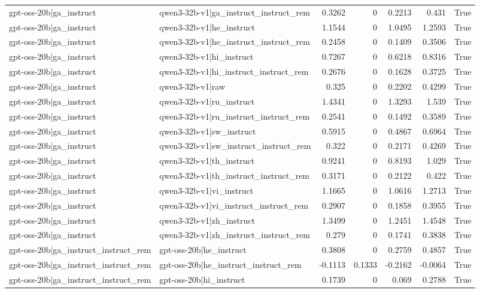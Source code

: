 \begin{table}
\begin{tabular}{l l r r r r l}
gpt-oss-20b|ga_instruct & qwen3-32b-v1|ga_instruct_instruct_rem & 0.3262 & 0 & 0.2213 & 0.431 & True \\
gpt-oss-20b|ga_instruct & qwen3-32b-v1|he_instruct & 1.1544 & 0 & 1.0495 & 1.2593 & True \\
gpt-oss-20b|ga_instruct & qwen3-32b-v1|he_instruct_instruct_rem & 0.2458 & 0 & 0.1409 & 0.3506 & True \\
gpt-oss-20b|ga_instruct & qwen3-32b-v1|hi_instruct & 0.7267 & 0 & 0.6218 & 0.8316 & True \\
gpt-oss-20b|ga_instruct & qwen3-32b-v1|hi_instruct_instruct_rem & 0.2676 & 0 & 0.1628 & 0.3725 & True \\
gpt-oss-20b|ga_instruct & qwen3-32b-v1|raw & 0.325 & 0 & 0.2202 & 0.4299 & True \\
gpt-oss-20b|ga_instruct & qwen3-32b-v1|ru_instruct & 1.4341 & 0 & 1.3293 & 1.539 & True \\
gpt-oss-20b|ga_instruct & qwen3-32b-v1|ru_instruct_instruct_rem & 0.2541 & 0 & 0.1492 & 0.3589 & True \\
gpt-oss-20b|ga_instruct & qwen3-32b-v1|sw_instruct & 0.5915 & 0 & 0.4867 & 0.6964 & True \\
gpt-oss-20b|ga_instruct & qwen3-32b-v1|sw_instruct_instruct_rem & 0.322 & 0 & 0.2171 & 0.4269 & True \\
gpt-oss-20b|ga_instruct & qwen3-32b-v1|th_instruct & 0.9241 & 0 & 0.8193 & 1.029 & True \\
gpt-oss-20b|ga_instruct & qwen3-32b-v1|th_instruct_instruct_rem & 0.3171 & 0 & 0.2122 & 0.422 & True \\
gpt-oss-20b|ga_instruct & qwen3-32b-v1|vi_instruct & 1.1665 & 0 & 1.0616 & 1.2713 & True \\
gpt-oss-20b|ga_instruct & qwen3-32b-v1|vi_instruct_instruct_rem & 0.2907 & 0 & 0.1858 & 0.3955 & True \\
gpt-oss-20b|ga_instruct & qwen3-32b-v1|zh_instruct & 1.3499 & 0 & 1.2451 & 1.4548 & True \\
gpt-oss-20b|ga_instruct & qwen3-32b-v1|zh_instruct_instruct_rem & 0.279 & 0 & 0.1741 & 0.3838 & True \\
gpt-oss-20b|ga_instruct_instruct_rem & gpt-oss-20b|he_instruct & 0.3808 & 0 & 0.2759 & 0.4857 & True \\
gpt-oss-20b|ga_instruct_instruct_rem & gpt-oss-20b|he_instruct_instruct_rem & -0.1113 & 0.1333 & -0.2162 & -0.0064 & True \\
gpt-oss-20b|ga_instruct_instruct_rem & gpt-oss-20b|hi_instruct & 0.1739 & 0 & 0.069 & 0.2788 & True \\

\end{tabular}
\end{table}
